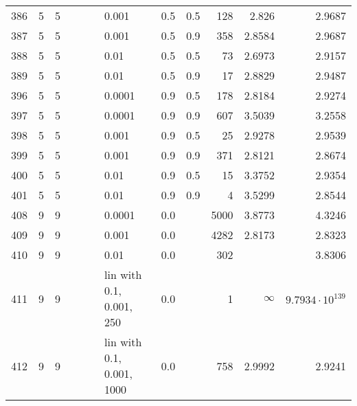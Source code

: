 \begin{longtable}{lrrrrrlrrrrr}
  386 &       5 & 5 &   &   &   &                       0.001 &      0.5 &    0.5 &     128 &                  2.826 &                 2.9687 \\
  387 &       5 & 5 &   &   &   &                       0.001 &      0.5 &    0.9 &     358 &                 2.8584 &                 2.9687 \\
  388 &       5 & 5 &   &   &   &                        0.01 &      0.5 &    0.5 &      73 &                 2.6973 &                 2.9157 \\
  389 &       5 & 5 &   &   &   &                        0.01 &      0.5 &    0.9 &      17 &                 2.8829 &                 2.9487 \\
  396 &       5 & 5 &   &   &   &                      0.0001 &      0.9 &    0.5 &     178 &                 2.8184 &                 2.9274 \\
  397 &       5 & 5 &   &   &   &                      0.0001 &      0.9 &    0.9 &     607 &                 3.5039 &                 3.2558 \\
  398 &       5 & 5 &   &   &   &                       0.001 &      0.9 &    0.5 &      25 &                 2.9278 &                 2.9539 \\
  399 &       5 & 5 &   &   &   &                       0.001 &      0.9 &    0.9 &     371 &                 2.8121 &                 2.8674 \\
  400 &       5 & 5 &   &   &   &                        0.01 &      0.9 &    0.5 &      15 &                 3.3752 &                 2.9354 \\
  401 &       5 & 5 &   &   &   &                        0.01 &      0.9 &    0.9 &       4 &                 3.5299 &                 2.8544 \\
  408 &       9 & 9 &   &   &   &                      0.0001 &      0.0 &        &    5000 &                 3.8773 &                 4.3246 \\
  409 &       9 & 9 &   &   &   &                       0.001 &      0.0 &        &    4282 &                 2.8173 &                 2.8323 \\
  410 &       9 & 9 &   &   &   &                        0.01 &      0.0 &        &     302 &                        &                 3.8306 \\
  411 &       9 & 9 &   &   &   &    lin with 0.1, 0.001, 250 &      0.0 &        &       1 &               $\infty$ & $9.7934\cdot 10^{139}$ \\
  412 &       9 & 9 &   &   &   &   lin with 0.1, 0.001, 1000 &      0.0 &        &     758 &                 2.9992 &                 2.9241 \\

\end{longtable}
